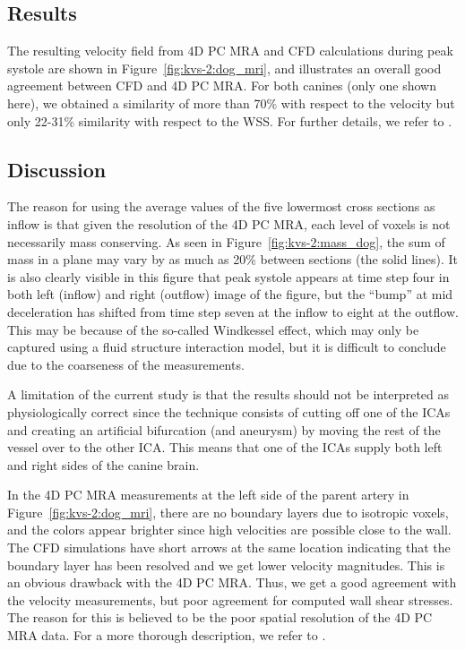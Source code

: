 \subsection{Results}

The resulting velocity field from 4D PC MRA and CFD calculations
during peak systole are shown in Figure~\ref{fig:kvs-2:dog_mri}, and
illustrates an overall good agreement between CFD and 4D PC MRA. For
both canines (only one shown here), we obtained a similarity of more
than 70\% with respect to the velocity but only 22-31\% similarity
with respect to the WSS. For further details, we refer
to \citet{JiangJohnsonValen-SendstadEtAl2010}.

\subsection{Discussion}

The reason for using the average values of the five lowermost cross
sections as inflow is that given the resolution of the 4D PC MRA, each
level of voxels is not necessarily mass conserving. As seen in
Figure~\ref{fig:kvs-2:mass_dog}, the sum of mass in a plane may vary
by as much as 20\% between sections (the solid lines).
It is also clearly visible in this figure that peak systole appears at
time step four in both left (inflow) and right (outflow) image of the
figure, but the ``bump'' at mid deceleration has shifted from time
step seven at the inflow to eight at the outflow.  This may be because
of the so-called Windkessel effect, which may only be captured using a
fluid structure interaction model, but it is difficult to conclude due
to the coarseness of the measurements.

A limitation of the current study is that the results should not be
interpreted as physiologically correct since the technique consists of
cutting off one of the ICAs and creating an artificial bifurcation
(and aneurysm) by moving the rest of the vessel over to the other
ICA. This means that one of the ICAs supply both left and right sides
of the canine brain.

In the 4D PC MRA measurements at the left side of the parent artery in
Figure~\ref{fig:kvs-2:dog_mri}, there are no boundary layers due to
isotropic voxels, and the colors appear brighter since high velocities
are possible close to the wall.  The CFD simulations have short arrows
at the same location indicating that the boundary layer has been
resolved and we get lower velocity magnitudes.  This is an obvious
drawback with the 4D PC MRA. Thus, we get a good agreement with the
velocity measurements, but poor agreement for computed wall shear
stresses. The reason for this is believed to be the poor spatial
resolution of the 4D PC MRA data. For a more thorough description, we
refer to \citet{JiangJohnsonValen-SendstadEtAl2010}.

